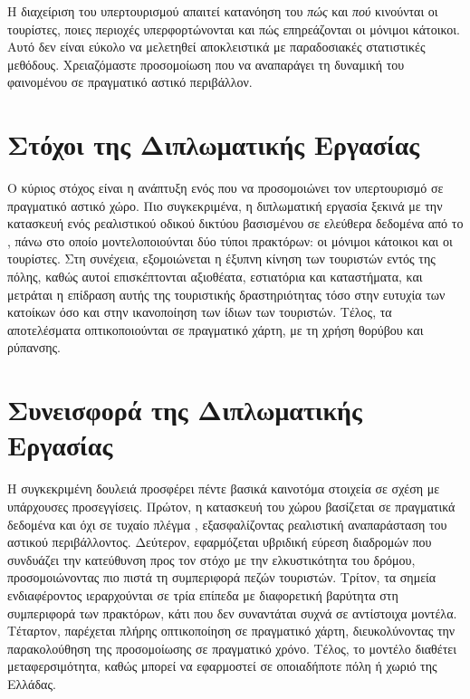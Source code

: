 Η διαχείριση του υπερτουρισμού απαιτεί κατανόηση του \emph{πώς} και
\emph{πού} κινούνται οι τουρίστες, ποιες περιοχές υπερφορτώνονται
και πώς επηρεάζονται οι μόνιμοι κάτοικοι. Αυτό δεν είναι εύκολο
να μελετηθεί αποκλειστικά με παραδοσιακές στατιστικές μεθόδους.
Χρειαζόμαστε προσομοίωση που να αναπαράγει τη δυναμική του
φαινομένου σε πραγματικό αστικό περιβάλλον.

\section{Στόχοι της Διπλωματικής Εργασίας}

Ο κύριος στόχος είναι η ανάπτυξη ενός 
που να προσομοιώνει τον υπερτουρισμό σε πραγματικό αστικό χώρο.
Πιο συγκεκριμένα, η διπλωματική εργασία ξεκινά με την κατασκευή ενός
ρεαλιστικού οδικού δικτύου βασισμένου σε ελεύθερα δεδομένα από το
, πάνω στο οποίο μοντελοποιούνται δύο τύποι
πρακτόρων: οι μόνιμοι κάτοικοι και οι τουρίστες. Στη συνέχεια,
εξομοιώνεται η έξυπνη κίνηση των τουριστών εντός της πόλης,
καθώς αυτοί επισκέπτονται αξιοθέατα, εστιατόρια και καταστήματα,
και μετράται η επίδραση αυτής της τουριστικής δραστηριότητας τόσο
στην ευτυχία των κατοίκων όσο και στην ικανοποίηση των ίδιων των
τουριστών. Τέλος, τα αποτελέσματα οπτικοποιούνται σε πραγματικό χάρτη,
με τη χρήση  θορύβου και ρύπανσης.

\section{Συνεισφορά της Διπλωματικής Εργασίας}

Η συγκεκριμένη δουλειά προσφέρει πέντε βασικά καινοτόμα στοιχεία σε
σχέση με υπάρχουσες προσεγγίσεις. Πρώτον, η κατασκευή του χώρου
βασίζεται σε πραγματικά δεδομένα  και όχι σε τυχαίο πλέγμα
, εξασφαλίζοντας ρεαλιστική αναπαράσταση του αστικού
περιβάλλοντος. Δεύτερον, εφαρμόζεται υβριδική εύρεση διαδρομών που
συνδυάζει την κατεύθυνση προς τον στόχο με την ελκυστικότητα του δρόμου,
προσομοιώνοντας πιο πιστά τη συμπεριφορά πεζών τουριστών. Τρίτον, τα
σημεία ενδιαφέροντος ιεραρχούνται σε τρία επίπεδα με διαφορετική
βαρύτητα στη συμπεριφορά των πρακτόρων, κάτι που δεν συναντάται συχνά
σε αντίστοιχα μοντέλα. Τέταρτον, παρέχεται πλήρης 
οπτικοποίηση σε πραγματικό χάρτη, διευκολύνοντας την παρακολούθηση της
προσομοίωσης σε πραγματικό χρόνο. Τέλος, το μοντέλο διαθέτει μεταφερσιμότητα,
καθώς μπορεί να εφαρμοστεί σε οποιαδήποτε πόλη ή χωριό της Ελλάδας.

